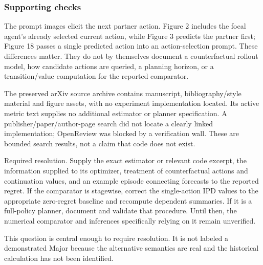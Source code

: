 \documentclass[10pt]{article}
\begin{document}
\subsubsection*{Supporting checks}
The prompt images elicit the next partner action. Figure 2 includes the focal agent’s already selected current action, while Figure 3 predicts the partner first; Figure 18 passes a single predicted action into an action-selection prompt. These differences matter. They do not by themselves document a counterfactual rollout model, how candidate actions are queried, a planning horizon, or a transition/value computation for the reported comparator.\par
The preserved arXiv source archive contains manuscript, bibliography/style material and figure assets, with no experiment implementation located. Its active metric text supplies no additional estimator or planner specification. A publisher/paper/author-page search did not locate a clearly linked implementation; OpenReview was blocked by a verification wall. These are bounded search results, not a claim that code does not exist.\par
Required resolution. Supply the exact estimator or relevant code excerpt, the information supplied to its optimizer, treatment of counterfactual actions and continuation values, and an example episode connecting forecasts to the reported regret. If the comparator is stagewise, correct the single-action IPD values to the appropriate zero-regret baseline and recompute dependent summaries. If it is a full-policy planner, document and validate that procedure. Until then, the numerical comparator and inferences specifically relying on it remain unverified.\par
This question is central enough to require resolution. It is not labeled a demonstrated Major because the alternative semantics are real and the historical calculation has not been identified.\par
\end{document}
